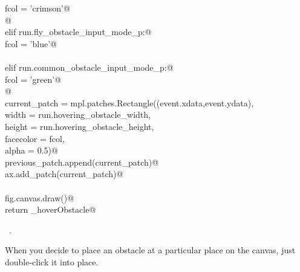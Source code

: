 \documentclass[11.5pt]{report}
\begin{document}
\begin{flushleft}
\begin{list}{}{}
\mbox{}\verb@                    fcol = 'crimson'@\\
\mbox{}\verb@    @\\
\mbox{}\verb@              elif run.fly_obstacle_input_mode_p:@\\
\mbox{}\verb@                     fcol = 'blue'@\\
\mbox{}\verb@@\\
\mbox{}\verb@              elif run.common_obstacle_input_mode_p:@\\
\mbox{}\verb@                     fcol = 'green'@\\
\mbox{}\verb@    @\\
\mbox{}\verb@              current_patch = mpl.patches.Rectangle((event.xdata,event.ydata),             \@\\
\mbox{}\verb@                                                 width     = run.hovering_obstacle_width,  \@\\
\mbox{}\verb@                                                 height    = run.hovering_obstacle_height,  \@\\
\mbox{}\verb@                                                 facecolor = fcol,   \@\\
\mbox{}\verb@                                                 alpha     = 0.5)@\\
\mbox{}\verb@              previous_patch.append(current_patch)@\\
\mbox{}\verb@              ax.add_patch(current_patch)@\\
\mbox{}\verb@@\\
\mbox{}\verb@              fig.canvas.draw()@\\
\mbox{}\verb@        return _hoverObstacle@\\
\mbox{}\verb@@{\NWsep}
\end{list}
\vspace{-1.5ex}
\footnotesize
\begin{list}{}{\setlength{\itemsep}{-\parsep}\setlength{\itemindent}{-\leftmargin}}
\item \NWtxtMacroRefIn\ .

\item{}
\end{list}
\vspace{4ex}
\end{flushleft}

When you decide to place an obstacle at a particular place on the canvas, just double-click it into place. 
\end{document}
